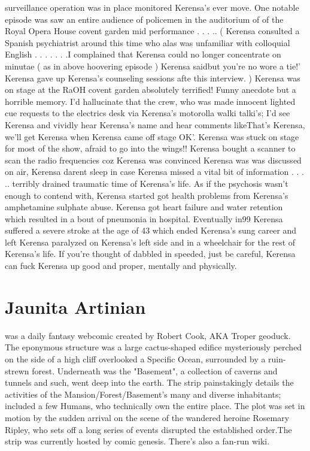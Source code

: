 \documentclass[12pt]{book}
\begin{document}
surveillance operation was in place monitored Kerensa's ever move. One notable episode was saw an entire audience of policemen in the auditorium of of the Royal Opera House covent garden mid performance . . . .. ( Kerensa consulted a Spanish psychiatrist around this time who alas was unfamiliar with colloquial English . . .   . . .  .I complained that Kerensa could no longer concentrate on minutae ( as in above hoovering episode ) Kerensa saidbut you're no wore a tie!' Kerensa gave up Kerensa's counseling sessions afte this interview. ) Kerensa was on stage at the RaOH covent garden absolutely terrified! Funny anecdote but a horrible memory. I'd hallucinate that the crew, who was made innocent lighted cue requests to the electrics desk via Kerensa's motorolla walki talki's; I'd see Kerensa and vividly hear Kerensa's name and hear comments likeThat's Kerensa, we'll get Kerensa when Kerensa came off stage OK'. Kerensa was stuck on stage for most of the show, afraid to go into the wings!! Kerensa bought a scanner to scan the radio frequencies coz Kerensa was convinced Kerensa was was discussed on air, Kerensa darent sleep in case Kerensa missed a vital bit of information . . . .. terribly drained traumatic time of Kerensa's life. As if the psychosis wasn't enough to contend with, Kerensa started got health problems from Kerensa's amphetamine sulphate abuse. Kerensa got heart failure and water retention which resulted in a bout of pneumonia in hospital. Eventually in99 Kerensa suffered a severe stroke at the age of 43 which ended Kerensa's sung career and left Kerensa paralyzed on Kerensa's left side and in a wheelchair for the rest of Kerensa's life. If you're thought of dabbled in speeded, just be careful, Kerensa can fuck Kerensa up good and proper, mentally and physically.



\chapter{Jaunita Artinian}

was a daily fantasy webcomic created by Robert Cook, AKA Troper geoduck. The eponymous structure was a large cactus-shaped edifice mysteriously perched on the side of a high cliff overlooked a Specific Ocean, surrounded by a ruin-strewn forest. Underneath was the "Basement", a collection of caverns and tunnels and such, went deep into the earth. The strip painstakingly details the activities of the Mansion/Forest/Basement's many and diverse inhabitants; included a few Humans, who technically own the entire place. The plot was set in motion by the sudden arrival on the scene of the wandered heroine Rosemary Ripley, who sets off a long series of events disrupted the established order.The strip was currently hosted by comic genesis. There's also a fan-run wiki.
\end{document}
